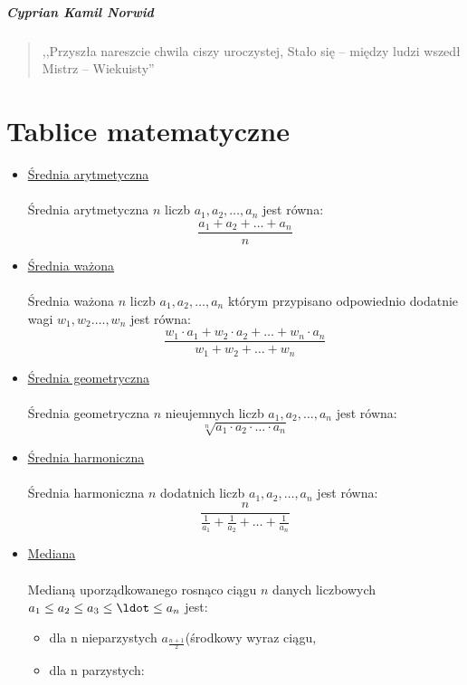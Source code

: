 \documentclass[oneside, fleqn]{book}
\begin{document}
\paragraph{Cyprian Kamil Norwid}
\begin{quote}
,,Przyszła nareszcie chwila ciszy uroczystej,
Stało się – między ludzi wszedł
Mistrz – Wiekuisty''
\end{quote}

\chapter{Tablice matematyczne}
\begin{itemize}
\item  \underline{Średnia arytmetyczna} \\ \\
Średnia arytmetyczna $n$ liczb $a_1,a_2,\dots,a_n$ jest równa: \\
\[ \frac{a_1+a_2+\ldots+a_n}{n} \]
\item \underline{Średnia ważona} \\ \\
Średnia ważona $n$ liczb $a_1,a_2,\dots,a_n$ którym przypisano odpowiednio dodatnie wagi $w_1,w_2.\dots,w_n$ jest równa: \\
\[ \frac{w_1 \cdot a_1 + w_2 \cdot a_2 + \ldots + w_n \cdot a_n}{w_1+w_2+\ldots+w_n} \]
\item  \underline{Średnia geometryczna} \\ \\
Średnia geometryczna $n$ nieujemnych liczb $a_1,a_2,\dots,a_n$ jest równa: \\
\[ \sqrt[n]{a_1 \cdot a_2 \cdot \ldots \cdot a_n} \]
\item  \underline{Średnia harmoniczna} \\ \\
Średnia harmoniczna $n$ dodatnich liczb $a_1,a_2,\dots,a_n$ jest równa: \\
\[ \frac{n}{\frac{1}{a_1}+\frac{1}{a_2}+\ldots+\frac{1}{a_n}}  \]
\item  \underline{Mediana} \\ \\
Medianą uporządkowanego rosnąco ciągu $n$ danych liczbowych $a_1 \le a_2 \le a_3 \le \ldot \le a_n$ jest: \\
\begin{itemize}
\item dla n nieparzystych $a_{\frac{n+1}{2}}$(środkowy wyraz ciągu,
\item dla n parzystych: 
\end{itemize}



\end{itemize}
\end{document}
